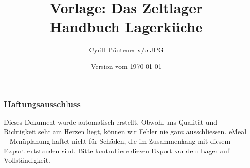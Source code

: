 \documentclass[11pt,a4paper]{article}%
\title{\Huge \textbf{Vorlage: Das Zeltlager} \\ \vspace{1.65cm} \Large \textbf{Handbuch Lagerküche}\\ \vspace{8cm}}%
\author{\normalsize Cyrill Püntener v/o JPG}%
\date{\normalsize Version vom \today}%
\begin{document}
%
\normalsize%
\clearpage%
\maketitle%
\thispagestyle{empty}%
\vfill%
\noindent%
{%
\color{gray}%
\subsubsection*{Haftungsausschluss}%
\label{ssubsec:Haftungsausschluss}%

%
\begin{small}%
Dieses Dokument wurde automatisch erstellt. Obwohl uns Qualität und Richtigkeit sehr am Herzen liegt, können wir Fehler nie ganz ausschliessen. eMeal – Menüplanung haftet nicht für Schäden, die im Zusammenhang mit diesem Export entstanden sind. Bitte kontrolliere diesen Export vor dem Lager auf Vollständigkeit.%
\end{small}%
}%
\newpage%
\end{document}
